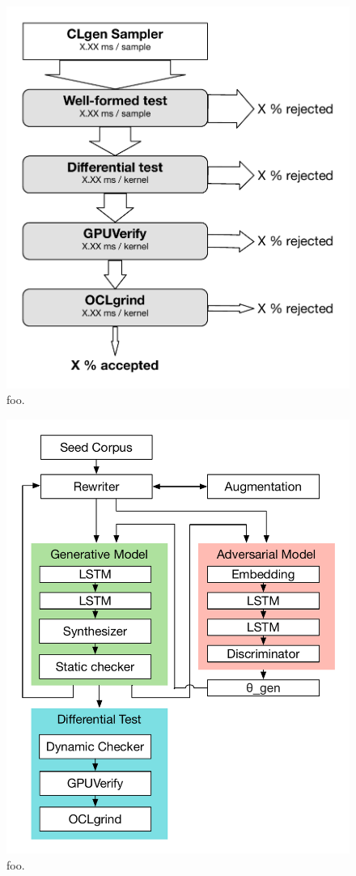 \begin{figure}
        \centering
        \includegraphics[width=.8\columnwidth]{img/rej} %
        \caption{%
                foo.%
        }%
        \label{fig:deeptune}
\end{figure}

\begin{figure}
        \centering
        \includegraphics[width=.95\columnwidth]{img/proc} %
        \caption{%
                foo.%
        }%
        \label{fig:deeptune}
\end{figure}










\printbibliography
        
